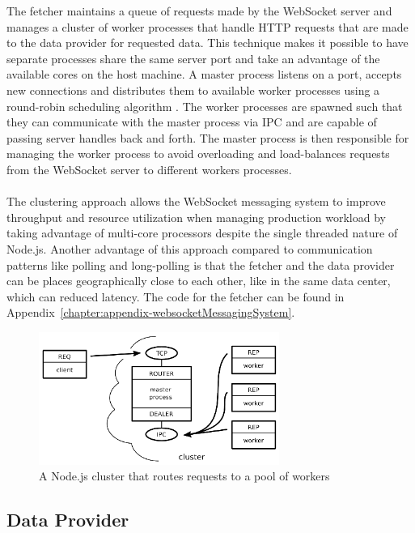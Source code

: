 The fetcher maintains a queue of requests made by the WebSocket server and manages a cluster of worker processes that handle HTTP requests that are made to the data provider for requested data. This technique makes it possible to have separate processes share the same server port and take an advantage of the available cores on the host machine. A master process listens on a port, accepts new connections and distributes them to available worker processes using a round-robin scheduling algorithm \cite{nodeCluster}. The worker processes are spawned such that they can communicate with the master process via IPC and are capable of passing server handles back and forth. The master process is then responsible for managing the worker process to avoid overloading and load-balances requests from the WebSocket server to different workers processes.
\\ \\
The clustering approach allows the WebSocket messaging system to improve throughput and resource utilization when managing production workload by taking advantage of multi-core processors despite the single threaded nature of Node.js. Another advantage of this approach compared to communication patterns like polling and long-polling is that the fetcher and the data provider can be places geographically close to each other, like in the same data center, which can reduced latency. The code for the fetcher can be found in Appendix~\ref{chapter:appendix-websocketMessagingSystem}.
\\
\begin{figure}[h!]
	\centering
	\label{fig:webSocketMessagingSystem}\includegraphics[width=0.7\textwidth]{images/poolOfWorkers}
	\caption{A Node.js cluster that routes requests to a pool of workers \cite{judd2008node}}
\end{figure}

\subsection{Data Provider}


